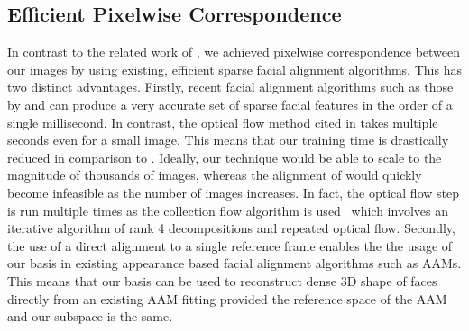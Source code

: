 \subsection{Efficient Pixelwise Correspondence}\label{subsec:correspondence}
In contrast to the related work of \citet{RefWorks:311},
we achieved pixelwise correspondence between our images by using existing,
efficient sparse facial alignment algorithms. This has two distinct advantages.
Firstly, recent facial alignment algorithms such as those by
\citet{Ren:it} and \citet{Kazemi:he} can produce a very accurate set
of sparse facial features in the order of a single millisecond. In contrast, the
optical flow method cited in \citet{RefWorks:311} takes multiple seconds even for
a small image. This means that our training time is drastically reduced in
comparison to \citet{RefWorks:311}. Ideally, our technique would be able to scale
to the magnitude of thousands of images, whereas the alignment of
\citet{RefWorks:311} would quickly become infeasible as the number of images
increases. In fact, the optical flow step is run multiple times as the
collection flow algorithm is used~\cite{RefWorks:290} which involves an
iterative algorithm of rank 4 decompositions and repeated optical flow.
Secondly, the use of a direct alignment to a single reference frame enables the
the usage of our basis in existing appearance based facial alignment algorithms
such as AAMs. This means that our basis can be used to reconstruct dense 3D
shape of faces directly from an existing AAM fitting provided the reference
space of the AAM and our subspace is the same.

